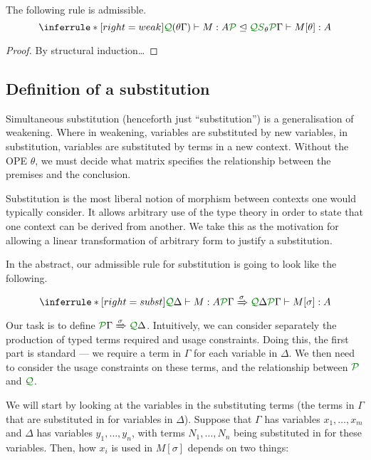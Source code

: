 \documentclass[acmsmall,review]{acmart}
\begin{document}
\begin{lemma}[weakening]\label{lem:weak}
  The following rule is admissible.
  \[
    \inferrule*[right=weak]{
      \ctx{(\theta\Gamma)}{Q} \vdash M : A
      \\ \resctx P \subres \resctx Q \resmat S_\theta
    }
    {
      \ctx{\Gamma}{P} \vdash M[\theta] : A
    }
  \]
\end{lemma}
\begin{proof}
  By structural induction\ldots
\end{proof}

\subsection{Definition of a substitution}

Simultaneous substitution (henceforth just ``substitution'') is a generalisation
of weakening.
Where in weakening, variables are substituted by new variables, in substitution,
variables are substituted by terms in a new context.
Without the OPE $\theta$, we must decide what matrix specifies the relationship
between the premises and the conclusion.

Substitution is the most liberal notion of morphism between contexts one would
typically consider.
It allows arbitrary use of the type theory in order to state that one context
can be derived from another.
We take this as the motivation for allowing a linear transformation of arbitrary
form to justify a substitution.

In the abstract, our admissible rule for substitution is going to look like the
following.

\[
  \inferrule*[right=subst]{
    \ctx{\Delta}{Q} \vdash M : A
    \\ \ctx{\Gamma}{P} \subst{\sigma} \ctx{\Delta}{Q}
  }
  {
    \ctx{\Gamma}{P} \vdash M[\sigma] : A
  }
\]

Our task is to define $\ctx{\Gamma}{P} \subst{\sigma} \ctx{\Delta}{Q}$.
Intuitively, we can consider separately the production of typed terms required
and usage constraints.
Doing this, the first part is standard --- we require a term in $\Gamma$ for
each variable in $\Delta$.
We then need to consider the usage constraints on these terms, and the
relationship between $\resctx P$ and $\resctx Q$.

We will start by looking at the variables in the substituting terms (the terms
in $\Gamma$ that are substituted in for variables in $\Delta$).
Suppose that $\Gamma$ has variables $x_1, \ldots, x_m$ and $\Delta$ has
variables $y_1, \ldots, y_n$, with terms $N_1, \ldots, N_n$ being substituted in
for these variables.
Then, how $x_i$ is used in $M[\sigma]$ depends on two things:
\end{document}
